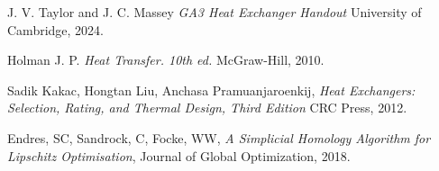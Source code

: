 \documentclass{article}
\begin{document}
\begin{thebibliography}{9}

    
      J. V. Taylor and J. C. Massey
      \emph{GA3 Heat Exchanger Handout}
      University of Cambridge,
      2024.
    
      Holman J. P.
      \emph{Heat Transfer. 10th ed.}
      McGraw-Hill,
      2010.
    
      Sadik Kakac, Hongtan Liu, Anchasa Pramuanjaroenkij,
      \emph{Heat Exchangers: Selection, Rating, and Thermal Design, Third Edition}
      CRC Press,
      2012.
    
      Endres, SC, Sandrock, C, Focke, WW,
      \emph{A Simplicial Homology Algorithm for Lipschitz Optimisation},
      Journal of Global Optimization,
      2018.
    
\end{thebibliography}
\end{document}
